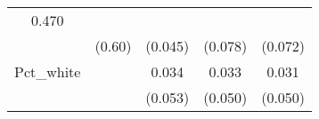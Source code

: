 \documentclass[12pt,twoside]{reedthesis}
\begin{document}
\begin{longtable}[]{@{}ccccc@{}}
\begin{minipage}[t]{0.12\columnwidth}
  0.470\strut
  \end{minipage}\tabularnewline
  \begin{minipage}[t]{0.26\columnwidth}\centering\strut
  \strut
  \end{minipage} & \begin{minipage}[t]{0.12\columnwidth}\centering\strut
  (0.60)\strut
  \end{minipage} & \begin{minipage}[t]{0.12\columnwidth}\centering\strut
  (0.045)\strut
  \end{minipage} & \begin{minipage}[t]{0.12\columnwidth}\centering\strut
  (0.078)\strut
  \end{minipage} & \begin{minipage}[t]{0.12\columnwidth}\centering\strut
  (0.072)\strut
  \end{minipage}\tabularnewline
  \begin{minipage}[t]{0.26\columnwidth}\centering\strut
  Pct\_white\strut
  \end{minipage} & \begin{minipage}[t]{0.12\columnwidth}\centering\strut
  \strut
  \end{minipage} & \begin{minipage}[t]{0.12\columnwidth}\centering\strut
  0.034\strut
  \end{minipage} & \begin{minipage}[t]{0.12\columnwidth}\centering\strut
  0.033\strut
  \end{minipage} & \begin{minipage}[t]{0.12\columnwidth}\centering\strut
  0.031\strut
  \end{minipage}\tabularnewline
  \begin{minipage}[t]{0.26\columnwidth}\centering\strut
  \strut
  \end{minipage} & \begin{minipage}[t]{0.12\columnwidth}\centering\strut
  \strut
  \end{minipage} & \begin{minipage}[t]{0.12\columnwidth}\centering\strut
  (0.053)\strut
  \end{minipage} & \begin{minipage}[t]{0.12\columnwidth}\centering\strut
  (0.050)\strut
  \end{minipage} & \begin{minipage}[t]{0.12\columnwidth}\centering\strut
  (0.050)\strut
  \end{minipage}\tabularnewline

\end{longtable}
\end{document}
